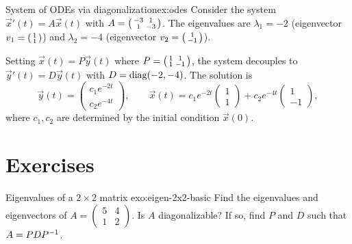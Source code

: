 \begin{example}{System of ODEs via diagonalization}{ex:odes}
Consider the system $\vec{x}'(t) = A\vec{x}(t)$ with
$A = \begin{psmallmatrix} -3 & 1 \\ 1 & -3 \end{psmallmatrix}$.
The eigenvalues are $\lambda_1 = -2$ (eigenvector
$v_1 = \begin{psmallmatrix}1\\1\end{psmallmatrix}$) and
$\lambda_2 = -4$ (eigenvector
$v_2 = \begin{psmallmatrix}1\\-1\end{psmallmatrix}$).

Setting $\vec{x}(t) = P\vec{y}(t)$ where
$P = \begin{psmallmatrix}1 & 1 \\ 1 & -1\end{psmallmatrix}$,
the system decouples to $\vec{y}'(t) = D\vec{y}(t)$ with
$D = \operatorname{diag}(-2,-4)$.  The solution is
\[
  \vec{y}(t) = \begin{pmatrix} c_1 e^{-2t} \\ c_2 e^{-4t} \end{pmatrix},
  \qquad
  \vec{x}(t) = c_1 e^{-2t}\begin{pmatrix}1\\1\end{pmatrix}
    + c_2 e^{-4t}\begin{pmatrix}1\\-1\end{pmatrix},
\]
where $c_1,c_2$ are determined by the initial condition
$\vec{x}(0)$.
\end{example}


\section{Exercises}\label{sec:eigenvalue-exercises}

\begin{exercise}{Eigenvalues of a $2\times 2$ matrix \basic}%
{exo:eigen-2x2-basic}
Find the eigenvalues and eigenvectors of
$A = \begin{pmatrix} 5 & 4 \\ 1 & 2 \end{pmatrix}$.
Is $A$ diagonalizable?  If so, find $P$ and $D$ such that
$A = PD{P}^{-1}$.
\end{exercise}

